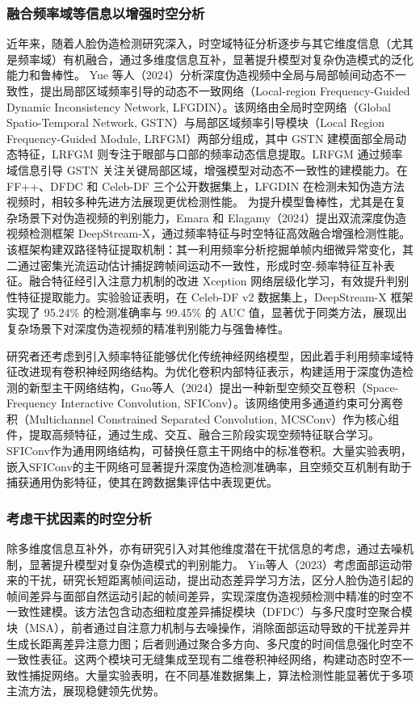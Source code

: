 \documentclass[conference]{IEEEtran}
\begin{document}
\subsubsection{融合频率域等信息以增强时空分析}
近年来，随着人脸伪造检测研究深入，时空域特征分析逐步与其它维度信息（尤其是频率域）有机融合，通过多维度信息互补，显著提升模型对复杂伪造模式的泛化能力和鲁棒性。
Yue 等人（2024）分析深度伪造视频中全局与局部帧间动态不一致性，提出局部区域频率引导的动态不一致网络（Local-region Frequency-Guided Dynamic Inconsistency Network, LFGDIN）。该网络由全局时空网络（Global Spatio-Temporal Network, GSTN）与局部区域频率引导模块（Local Region Frequency-Guided Module, LRFGM）两部分组成，其中 GSTN 建模面部全局动态特征，LRFGM 则专注于眼部与口部的频率动态信息提取。LRFGM 通过频率域信息引导 GSTN 关注关键局部区域，增强模型对动态不一致性的建模能力。在 FF++、DFDC 和 Celeb-DF 三个公开数据集上，LFGDIN 在检测未知伪造方法视频时，相较多种先进方法展现更优检测性能\cite{YueChen-66}。
为提升模型鲁棒性，尤其是在复杂场景下对伪造视频的判别能力，Emara 和 Elagamy（2024）提出双流深度伪造视频检测框架 DeepStream-X，通过频率特征与时空特征高效融合增强检测性能。该框架构建双路径特征提取机制：其一利用频率分析挖掘单帧内细微异常变化，其二通过密集光流运动估计捕捉跨帧间运动不一致性，形成时空-频率特征互补表征。融合特征经引入注意力机制的改进 Xception 网络层级化学习，有效提升判别性特征提取能力。实验验证表明，在 Celeb-DF v2 数据集上，DeepStream-X 框架实现了 95.24\% 的检测准确率与 99.45\% 的 AUC 值，显著优于同类方法，展现出复杂场景下对深度伪造视频的精准判别能力与强鲁棒性\cite{NM414}。

研究者还考虑到引入频率特征能够优化传统神经网络模型，因此着手利用频率域特征改进现有卷积神经网络结构。为优化卷积内部特征表示，构建适用于深度伪造检测的新型主干网络结构，Guo等人（2024）提出一种新型空频交互卷积（Space-Frequency Interactive Convolution, SFIConv）。该网络使用多通道约束可分离卷积（Multichannel Constrained Separated Convolution, MCSConv）作为核心组件，提取高频特征，通过生成、交互、融合三阶段实现空频特征联合学习。SFIConv作为通用网络结构，可替换任意主干网络中的标准卷积。大量实验表明，嵌入SFIConv的主干网络可显著提升深度伪造检测准确率，且空频交互机制有助于捕获通用伪影特征，使其在跨数据集评估中表现更优\cite{GuoJia-191}。

\subsubsection{考虑干扰因素的时空分析}
除多维度信息互补外，亦有研究引入对其他维度潜在干扰信息的考虑，通过去噪机制，显著提升模型对复杂伪造模式的判别能力。
Yin等人（2023）考虑面部运动带来的干扰，研究长短距离帧间运动，提出动态差异学习方法，区分人脸伪造引起的帧间差异与面部自然运动引起的帧间差异，实现深度伪造视频检测中精准的时空不一致性建模。该方法包含动态细粒度差异捕捉模块（DFDC）与多尺度时空聚合模块（MSA），前者通过自注意力机制与去噪操作，消除面部运动导致的干扰差异并生成长距离差异注意力图；后者则通过聚合多方向、多尺度的时间信息强化时空不一致性表征。这两个模块可无缝集成至现有二维卷积神经网络，构建动态时空不一致性捕捉网络。大量实验表明，在不同基准数据集上，算法检测性能显著优于多项主流方法，展现稳健领先优势\cite{YinLu-279}。
\end{document}
